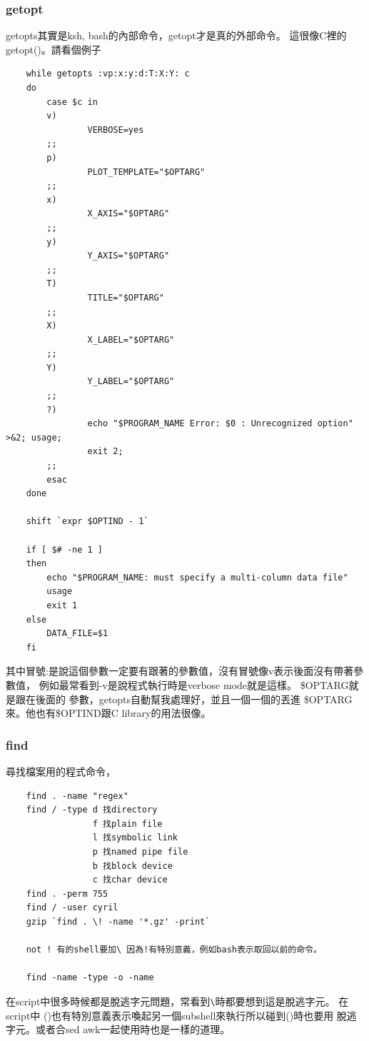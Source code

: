     \subsubsection{getopt}
    getopts其實是ksh, bash的內部命令，getopt才是真的外部命令。
    這很像C裡的getopt()。請看個例子
    \begin{verbatim}
    while getopts :vp:x:y:d:T:X:Y: c
    do
        case $c in
        v) 
                VERBOSE=yes
        ;;
        p)
                PLOT_TEMPLATE="$OPTARG"
        ;;
        x)
                X_AXIS="$OPTARG"
        ;;
        y)
                Y_AXIS="$OPTARG"
        ;;
        T)
                TITLE="$OPTARG"
        ;;
        X)
                X_LABEL="$OPTARG"
        ;;
        Y)
                Y_LABEL="$OPTARG"
        ;;
        ?)       
                echo "$PROGRAM_NAME Error: $0 : Unrecognized option" >&2; usage;
                exit 2;
        ;;
        esac
    done

    shift `expr $OPTIND - 1`

    if [ $# -ne 1 ]
    then
        echo "$PROGRAM_NAME: must specify a multi-column data file"
        usage
        exit 1
    else
        DATA_FILE=$1
    fi
    \end{verbatim}
    其中冒號:是說這個參數一定要有跟著的參數值，沒有冒號像v表示後面沒有帶著參
    數值， 例如最常看到-v是說程式執行時是verbose mode就是這樣。
    \$OPTARG就是跟在後面的 參數，getopts自動幫我處理好，並且一個一個的丟進
    \$OPTARG來。他也有\$OPTIND跟C library的用法很像。
 
    \subsubsection{find}
    尋找檔案用的程式命令，
    \begin{verbatim}
    find . -name "regex"
    find / -type d 找directory
                 f 找plain file
                 l 找symbolic link
                 p 找named pipe file
                 b 找block device
                 c 找char device
    find . -perm 755
    find / -user cyril
    gzip `find . \! -name '*.gz' -print`

    not ! 有的shell要加\ 因為!有特別意義，例如bash表示取回以前的命令。

    find -name -type -o -name
    \end{verbatim}
    在script中很多時候都是脫逃字元問題，常看到\verb=\=時都要想到這是脫逃字元。
    在script中 ()也有特別意義表示喚起另一個subshell來執行所以碰到()時也要用
    脫逃字元。或者合sed awk一起使用時也是一樣的道理。

